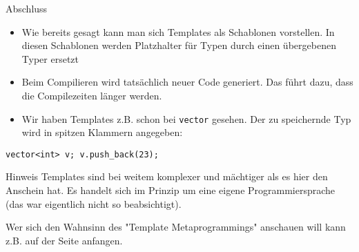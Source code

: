\documentclass[presentation]{beamer}
\begin{document}
\begin{frame}[label={sec:orgf3070fc},fragile]{Abschluss}
 \begin{itemize}
\item Wie bereits gesagt kann man sich Templates als \alert{Schablonen}
vorstellen. In diesen Schablonen werden Platzhalter für Typen durch
einen übergebenen Typer ersetzt
\item Beim Compilieren wird tatsächlich \alert{neuer Code generiert}. Das führt
dazu, dass die Compilezeiten länger werden.
\item Wir haben Templates z.B. schon bei {\color{solarizedYellow}\verb!vector!} gesehen. Der zu
speichernde Typ wird in spitzen Klammern angegeben:
\end{itemize}
\begin{verbatim}
vector<int> v; v.push_back(23);
\end{verbatim}
\begin{block}{Hinweis}
Templates sind bei weitem komplexer und mächtiger als es hier den
Anschein hat. Es handelt sich im Prinzip um eine eigene
Programmiersprache (das war eigentlich nicht so beabsichtigt).

Wer sich den Wahnsinn des "\alert{Template Metaprogrammings}" anschauen will
kann z.B. auf der \uline{\href{https://en.wikipedia.org/wiki/Template\_metaprogramming}{\color{blue}{Wikipedia}}} Seite anfangen.
\end{block}
\end{frame}
\end{document}
